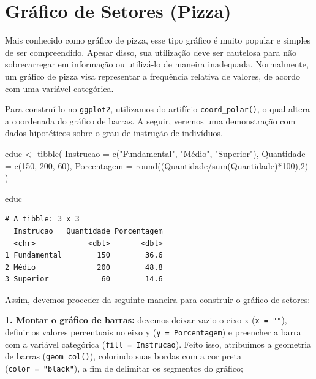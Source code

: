 \documentclass[
  brazilian,
]{book}
\newenvironment{Shaded}{\begin{snugshade}}{\end{snugshade}}
\newcommand{\AttributeTok}[1]{\textcolor[rgb]{0.77,0.63,0.00}{#1}}
\newcommand{\DecValTok}[1]{\textcolor[rgb]{0.00,0.00,0.81}{#1}}
\newcommand{\FunctionTok}[1]{\textcolor[rgb]{0.00,0.00,0.00}{#1}}
\newcommand{\NormalTok}[1]{#1}
\newcommand{\OtherTok}[1]{\textcolor[rgb]{0.56,0.35,0.01}{#1}}
\newcommand{\SpecialCharTok}[1]{\textcolor[rgb]{0.00,0.00,0.00}{#1}}
\newcommand{\StringTok}[1]{\textcolor[rgb]{0.31,0.60,0.02}{#1}}
\begin{document}
\hypertarget{gruxe1fico-de-setores-pizza}{%
\section{Gráfico de Setores (Pizza)}\label{gruxe1fico-de-setores-pizza}}

Mais conhecido como gráfico de pizza, esse tipo gráfico é muito popular e simples de ser compreendido. Apesar disso, sua utilização deve ser cautelosa para não sobrecarregar em informação ou utilizá-lo de maneira inadequada. Normalmente, um gráfico de pizza visa representar a frequência relativa de valores, de acordo com uma variável categórica.

Para construí-lo no \texttt{ggplot2}, utilizamos do artifício \texttt{coord\_polar()}, o qual altera a coordenada do gráfico de barras. A seguir, veremos uma demonstração com dados hipotéticos sobre o grau de instrução de indivíduos.

\begin{Shaded}
\begin{Highlighting}[]
\NormalTok{educ }\OtherTok{\textless{}{-}} \FunctionTok{tibble}\NormalTok{(}
  \AttributeTok{Instrucao =} \FunctionTok{c}\NormalTok{(}\StringTok{"Fundamental"}\NormalTok{, }\StringTok{"Médio"}\NormalTok{, }\StringTok{"Superior"}\NormalTok{),}
  \AttributeTok{Quantidade =} \FunctionTok{c}\NormalTok{(}\DecValTok{150}\NormalTok{, }\DecValTok{200}\NormalTok{, }\DecValTok{60}\NormalTok{),}
  \AttributeTok{Porcentagem =} \FunctionTok{round}\NormalTok{((Quantidade}\SpecialCharTok{/}\FunctionTok{sum}\NormalTok{(Quantidade)}\SpecialCharTok{*}\DecValTok{100}\NormalTok{),}\DecValTok{2}\NormalTok{)}
\NormalTok{)}

\NormalTok{educ}
\end{Highlighting}
\end{Shaded}

\begin{verbatim}
# A tibble: 3 x 3
  Instrucao   Quantidade Porcentagem
  <chr>            <dbl>       <dbl>
1 Fundamental        150        36.6
2 Médio              200        48.8
3 Superior            60        14.6
\end{verbatim}

Assim, devemos proceder da seguinte maneira para construir o gráfico de setores:

\textbf{1. Montar o gráfico de barras:} devemos deixar vazio o eixo x (\texttt{x\ =\ ""}), definir os valores percentuais no eixo y (\texttt{y\ =\ Porcentagem}) e preencher a barra com a variável categórica (\texttt{fill\ =\ Instrucao}). Feito isso, atribuímos a geometria de barras (\texttt{geom\_col()}), colorindo suas bordas com a cor preta (\texttt{color\ =\ "black"}), a fim de delimitar os segmentos do gráfico;
\end{document}
